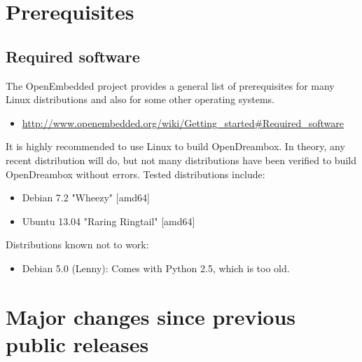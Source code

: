 \documentclass[a4paper]{article}
\begin{document}
\section{Prerequisites}
  \label{prerequisites}

  \subsection{Required software}

   The OpenEmbedded project provides a general list of prerequisites for
   many Linux distributions and also for some other operating systems.

   \begin{itemize}
     \item \url{http://www.openembedded.org/wiki/Getting\_started#Required\_software}
   \end{itemize}

   It is highly recommended to use Linux to build OpenDreambox. In theory,
   any recent distribution will do, but not many distributions have been
   verified to build OpenDreambox without errors. Tested distributions
   include:

   \begin{itemize}
     \item Debian 7.2 "Wheezy" [amd64]
     \item Ubuntu 13.04 "Raring Ringtail" [amd64]
   \end{itemize}

   Distributions known not to work:

   \begin{itemize}
     \item Debian 5.0 (Lenny): Comes with Python 2.5, which is too old.
   \end{itemize}

\pagebreak

\section{Major changes since previous public releases}
\end{document}
